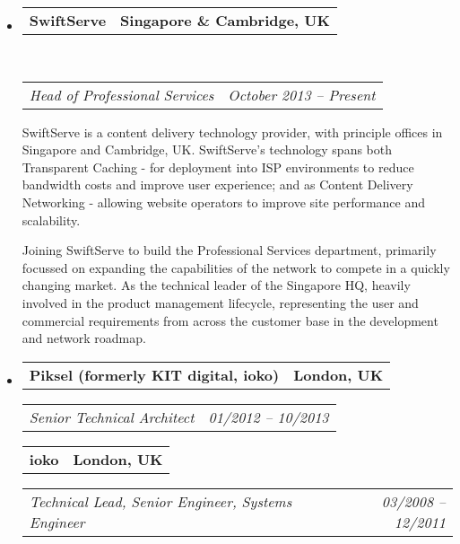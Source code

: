 \documentclass[10pt,a4paper]{article}
\makeatletter
\newcommand{\headerrow}[2]
{\begin{tabular*}{\linewidth}{l@{\extracolsep{\fill}}r}
    #1 &
    #2 \\
\end{tabular*}}
\makeatother
\begin{document}
\begin{itemize}
    \parskip=0.1em

    \item
        \headerrow
            {\textbf{SwiftServe}}
            {\textbf{Singapore \& Cambridge, UK}}
        \\
        \headerrow
            {\emph{Head of Professional Services}}
            {\emph{October 2013 -- Present}}
    
            SwiftServe is a content delivery technology provider, with principle offices in Singapore and Cambridge, UK. SwiftServe's technology spans both Transparent Caching - for deployment into ISP environments to reduce bandwidth costs and improve user experience; and as Content Delivery Networking - allowing website operators to improve site performance and scalability.

            Joining SwiftServe to build the Professional Services department, primarily focussed on expanding the capabilities of the network to compete in a quickly changing market. As the technical leader of the Singapore HQ, heavily involved in the product management lifecycle, representing the user and commercial requirements from across the customer base in the development and network roadmap.
            

    \item
    \headerrow
        {\textbf{Piksel (formerly KIT digital, ioko)}}
        {\textbf{London, UK}}
    \headerrow
        {\emph{Senior Technical Architect}}
        {\emph{01/2012 -- 10/2013}}
    \headerrow
        {\textbf{ioko}}
        {\textbf{London, UK}}   
    \headerrow
        {\emph{Technical Lead, Senior Engineer, Systems Engineer}}
        {\emph{03/2008 -- 12/2011}}


\end{itemize}
\end{document}
